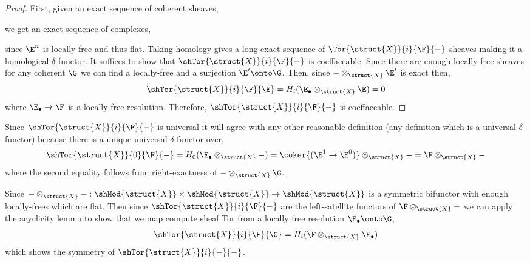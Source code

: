 \documentclass[12pt]{article}
\begin{document}
\begin{proof}
First, given an exact sequence of coherent sheaves,
\begin{center}
\end{center}
we get an exact sequence of complexes,
\begin{center}
\end{center}
since $\E^n$ is locally-free and thus flat. Taking homology gives a long exact sequence of $\Tor{\struct{X}}{i}{\F}{-}$ sheaves making it a homological $\delta$-functor.
It suffices to show that $\shTor{\struct{X}}{i}{\F}{-}$ is coeffaceable. Since there are enough locally-free sheaves for any coherent $\G$ we can find a locally-free and a surjection $\E' \onto \G$. Then, since $- \otimes_{\struct{X}} \E'$ is exact then,
\[ \shTor{\struct{X}}{i}{\F}{\E} = H_i(\E_\bullet \otimes_{\struct{X}} \E) = 0 \]
where $\E_\bullet \to \F$ is a locally-free resolution. Therefore, $\shTor{\struct{X}}{i}{\F}{-}$ is coeffaceable.
\end{proof}

\begin{rmk}
Since $\shTor{\struct{X}}{i}{\F}{-}$ is universal it will agree with any other reasonable definition (any definition which is a universal $\delta$-functor) because there is a unique universal $\delta$-functor over,
\[ \shTor{\struct{X}}{0}{\F}{-} = H_0(\E_\bullet \otimes_{\struct{X}} -) = \coker{(\E^1 \to \E^0)} \otimes_{\struct{X}} - = \F \otimes_{\struct{X}} - \]
where the second equality follows from right-exactness of $- \otimes_{\struct{X}} \G$. 
\end{rmk}

\begin{rmk}
Since $- \otimes_{\struct{X}} - : \shMod{\struct{X}} \times \shMod{\struct{X}} \to \shMod{\struct{X}}$ is a symmetric bifunctor with enough locally-frees which are flat. Then since $\shTor{\struct{X}}{i}{\F}{-}$ are the left-satellite functors of $\F \otimes_{\struct{X}} -$ we can apply the acyclicity lemma to show that we map compute sheaf Tor from a locally free resolution $\E_\bullet \onto \G$,
\[ \shTor{\struct{X}}{i}{\F}{\G} = H_i(\F \otimes_{\struct{X}} \E_\bullet) \]
which shows the symmetry of $\shTor{\struct{X}}{i}{-}{-}$. 
\end{rmk}
\end{document}
